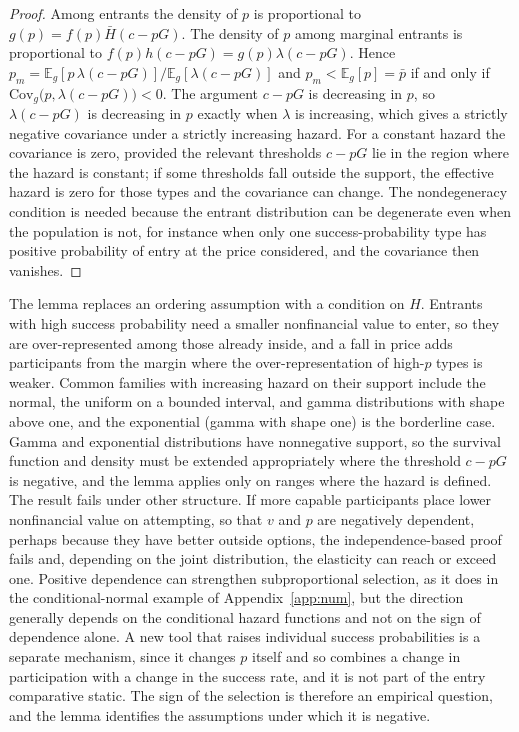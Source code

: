 \documentclass[11pt]{article}
\theoremstyle{remark}
\newcommand{\E}{\mathbb{E}}
\newcommand{\Hbar}{\bar H}
\begin{document}
\begin{proof}
Among entrants the density of $p$ is proportional to $g(p)=f(p)\Hbar(c-pG)$. The density of $p$ among marginal entrants is proportional to $f(p)h(c-pG)=g(p)\lambda(c-pG)$. Hence $p_m=\E_g[p\,\lambda(c-pG)]/\E_g[\lambda(c-pG)]$ and $p_m<\E_g[p]=\bar p$ if and only if $\mathrm{Cov}_g\bigl(p,\lambda(c-pG)\bigr)<0$. The argument $c-pG$ is decreasing in $p$, so $\lambda(c-pG)$ is decreasing in $p$ exactly when $\lambda$ is increasing, which gives a strictly negative covariance under a strictly increasing hazard. For a constant hazard the covariance is zero, provided the relevant thresholds $c-pG$ lie in the region where the hazard is constant; if some thresholds fall outside the support, the effective hazard is zero for those types and the covariance can change. The nondegeneracy condition is needed because the entrant distribution can be degenerate even when the population is not, for instance when only one success-probability type has positive probability of entry at the price considered, and the covariance then vanishes.
\end{proof}

The lemma replaces an ordering assumption with a condition on $H$. Entrants with high success probability need a smaller nonfinancial value to enter, so they are over-represented among those already inside, and a fall in price adds participants from the margin where the over-representation of high-$p$ types is weaker. Common families with increasing hazard on their support include the normal, the uniform on a bounded interval, and gamma distributions with shape above one, and the exponential (gamma with shape one) is the borderline case. Gamma and exponential distributions have nonnegative support, so the survival function and density must be extended appropriately where the threshold $c-pG$ is negative, and the lemma applies only on ranges where the hazard is defined. The result fails under other structure. If more capable participants place lower nonfinancial value on attempting, so that $v$ and $p$ are negatively dependent, perhaps because they have better outside options, the independence-based proof fails and, depending on the joint distribution, the elasticity can reach or exceed one. Positive dependence can strengthen subproportional selection, as it does in the conditional-normal example of Appendix~\ref{app:num}, but the direction generally depends on the conditional hazard functions and not on the sign of dependence alone. A new tool that raises individual success probabilities is a separate mechanism, since it changes $p$ itself and so combines a change in participation with a change in the success rate, and it is not part of the entry comparative static. The sign of the selection is therefore an empirical question, and the lemma identifies the assumptions under which it is negative.
\end{document}
